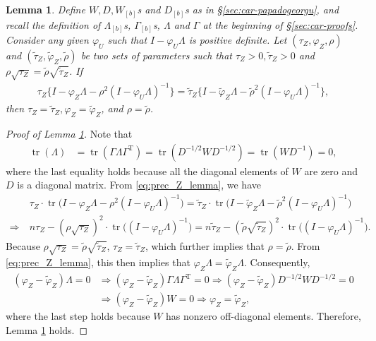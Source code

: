 \documentclass[11pt]{article}
\newtheorem{lemma}{Lemma}
\theoremstyle{definition}
\theoremstyle{remark}
\DeclareMathOperator{\tr}{tr}
\def\top{{ \mathrm{\scriptscriptstyle T} }}
\begin{document}
\begin{lemma}\label{lem:prec_Z}
Define $W, D, W_{[b]}$s and $D_{[b]}$s
as in \S\ref{sec:car-papadogeorgu}, 
and recall the definition of $\Lambda_{[b]}$s,
$\Gamma_{[b]}$s, $\Lambda$ and $\Gamma$ at the beginning of \S\ref{sec:car-proofs}. 
Consider any given $\varphi_U$ such that $I - \varphi_U \Lambda$ is positive definite. 
Let $(\tau_Z, \varphi_Z, \rho)$ and $(\tilde{\tau}_Z, \tilde{\varphi}_Z, \tilde{\rho})$ be two sets of parameters such that $\tau_Z>0, \tilde{\tau}_Z>0$ and $\rho \sqrt{\tau_Z} = \tilde{\rho} \sqrt{\tilde{\tau}_Z}$. 
If 
\begin{align}\label{eq:prec_Z_lemma}
     \tau_Z \big\{ I - \varphi_Z \Lambda - \rho^2 (I - \varphi_U \Lambda)^{-1} \big\}
     = 
    \tilde{\tau}_Z \big\{ I - \tilde{\varphi}_Z \Lambda - \tilde{\rho}^2 (I - \varphi_U \Lambda)^{-1} \big\}, 
\end{align}
then $\tau_Z=\tilde{\tau}_Z, \varphi_Z=\tilde{\varphi}_Z$, and $\rho = \tilde{\rho}$. 
\end{lemma}

\begin{proof}[Proof of Lemma \ref{lem:prec_Z}]
Note that 
\begin{align*}
    \tr(\Lambda) & = \tr(\Gamma \Lambda \Gamma^\top) = \tr(D^{-1/2} W D^{-1/2}) = \tr( W D^{-1}) = 0,
\end{align*}
where the last equality holds because all the diagonal elements of $W$ are zero and $D$ is a diagonal matrix. 
From \eqref{eq:prec_Z_lemma}, we have 
\begin{align*}
    & \tau_Z \cdot \tr\big( I - \varphi_Z \Lambda - \rho^2 (I - \varphi_U \Lambda)^{-1} \big)
     = 
    \tilde{\tau}_Z \cdot \tr\big( I - \tilde{\varphi}_Z \Lambda - \tilde{\rho}^2 (I - \varphi_U \Lambda)^{-1} \big)
    \\
    \Longrightarrow \ 
    & 
    n \tau_Z - (\rho \sqrt{\tau_Z})^2 \cdot \tr\big( (I - \varphi_U \Lambda)^{-1} \big)
    = 
    n \tilde{\tau}_Z - \left(\tilde{\rho} \sqrt{\tilde{\tau}_Z}\right)^2 \cdot \tr\big( (I - \varphi_U \Lambda)^{-1} \big).
\end{align*}
Because $\rho \sqrt{\tau_Z} = \tilde{\rho} \sqrt{\tilde{\tau}_Z}$, $\tau_Z=\tilde{\tau}_Z$, which further implies that $\rho = \tilde{\rho}$. 
From \eqref{eq:prec_Z_lemma}, 
this then implies that $\varphi_Z \Lambda = \tilde{\varphi}_Z \Lambda$. 
Consequently, 
\begin{align*}
     (\varphi_Z - \tilde{\varphi}_Z) \Lambda = 0
    & \Longrightarrow (\varphi_Z - \tilde{\varphi}_Z) \Gamma \Lambda \Gamma^\top = 0
    \Longrightarrow (\varphi_Z - \tilde{\varphi}_Z) D^{-1/2} W D^{-1/2} = 0
    \\
    & \Longrightarrow (\varphi_Z - \tilde{\varphi}_Z) W = 0 
    \Longrightarrow \varphi_Z = \tilde{\varphi}_Z, 
\end{align*}
where the last step holds because $W$ has nonzero off-diagonal elements. 
Therefore, Lemma \ref{lem:prec_Z} holds. 
\end{proof}
\end{document}

